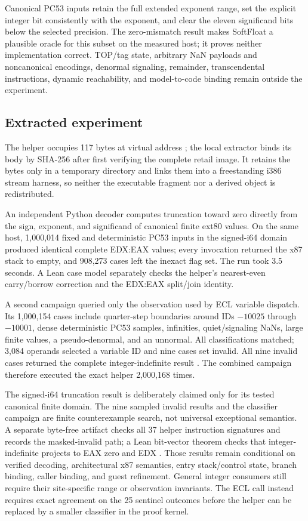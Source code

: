 Canonical PC53 inputs retain the full extended exponent range, set the
explicit integer bit consistently with the exponent, and clear the eleven
significand bits below the selected precision.  The zero-mismatch result makes
SoftFloat a plausible oracle for this subset on the measured host; it proves
neither implementation correct.  TOP/tag state, arbitrary NaN payloads and
noncanonical encodings,  denormal signaling, remainder,
transcendental instructions, dynamic reachability, and model-to-code binding
remain outside the experiment.

\subsection{Extracted  experiment}

The helper occupies 117 bytes at virtual address ; the local
extractor binds its body by SHA-256 after first verifying the complete retail
image.  It retains the bytes only in a temporary directory and links them into
a freestanding i386 stream harness, so neither the executable fragment nor a
derived object is redistributed.

An independent Python decoder computes truncation toward zero directly from
the sign, exponent, and significand of canonical finite ext80 values.  On the
same host, 1,000,014 fixed and deterministic PC53 inputs in the signed-i64
domain produced identical complete EDX:EAX values; every invocation returned
the x87 stack to empty, and 908,273 cases left the inexact flag set.  The run
took 3.5 seconds.  A Lean case model separately checks the helper's
nearest-even carry/borrow correction and the EDX:EAX split/join identity.

A second campaign queried only the observation used by ECL variable dispatch.
Its 1,000,154 cases include quarter-step boundaries around IDs $-10025$ through
$-10001$, dense deterministic PC53 samples, infinities, quiet/signaling NaNs,
large finite values, a pseudo-denormal, and an unnormal.  All classifications
matched; 3,084 operands selected a variable ID and nine cases set invalid.
All nine invalid cases returned the complete integer-indefinite result
.  The combined campaign therefore executed the exact
helper 2,000,168 times.

The signed-i64 truncation result is deliberately claimed only for its tested
canonical finite domain.  The nine sampled invalid results and the classifier
campaign are finite counterexample search, not universal exceptional
semantics.  A separate byte-free artifact checks all 37 helper instruction
signatures and records the masked-invalid path; a Lean bit-vector theorem
checks that integer-indefinite projects to EAX zero and EDX
.  Those results remain conditional on verified decoding,
architectural x87 semantics, entry stack/control state, branch binding, caller
binding, and guest refinement.  General integer consumers still require their
site-specific range or observation invariants.  The ECL call instead requires
exact agreement on the 25 sentinel outcomes before the helper can be replaced
by a smaller classifier in the proof kernel.

